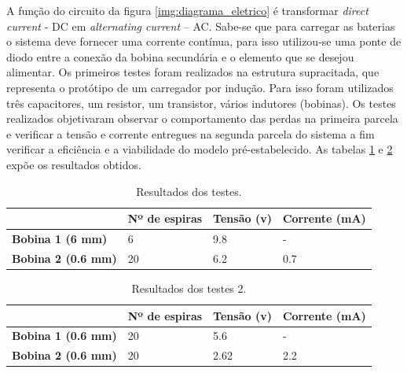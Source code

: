 A função do circuito da figura \ref{img:diagrama_eletrico} é transformar \textit{direct current} - DC em \textit{alternating current} – AC. Sabe-se que para carregar as baterias o sistema deve fornecer uma corrente contínua, para isso utilizou-se uma ponte de diodo entre a conexão da bobina secundária e o elemento que se desejou alimentar.
Os primeiros testes foram realizados na estrutura supracitada, que representa o protótipo de um carregador por indução. Para isso foram utilizados três capacitores, um resistor, um transistor, vários indutores (bobinas).
Os testes realizados objetivaram observar o comportamento das perdas na primeira parcela e verificar a tensão e corrente entregues na segunda parcela do sistema a fim verificar a eficiência e a viabilidade do modelo pré-estabelecido.
As tabelas \ref{tab:resultadotestescarregadorinducao} e \ref{tab:resultadotestescarregadorinducao2} expõe os resultados obtidos.

\begin{table}[]
\centering
\caption{Resultados dos testes.}
\label{tab:resultadotestescarregadorinducao}
\begin{tabular}{l|l|l|l|}
\cline{2-4}
\textbf{}                                        & \textbf{Nº de espiras} & \textbf{Tensão (v)} & \textbf{Corrente (mA)} \\ \hline
\multicolumn{1}{|l|}{\textbf{Bobina 1 (6 mm)}}   & 6                      & 9.8                 & -                      \\ \hline
\multicolumn{1}{|l|}{\textbf{Bobina 2 (0.6 mm)}} & 20                     & 6.2                 & 0.7                    \\ \hline
\end{tabular}
\end{table}

\begin{table}[]
\centering
\caption{Resultados dos testes 2.}
\label{tab:resultadotestescarregadorinducao2}
\begin{tabular}{l|l|l|l|}
\cline{2-4}
\textbf{}                                        & \textbf{Nº de espiras} & \textbf{Tensão (v)} & \textbf{Corrente (mA)} \\ \hline
\multicolumn{1}{|l|}{\textbf{Bobina 1 (0.6 mm)}} & 20                     & 5.6                 & -                      \\ \hline
\multicolumn{1}{|l|}{\textbf{Bobina 2 (0.6 mm)}} & 20                     & 2.62                & 2.2                    \\ \hline
\end{tabular}
\end{table}


